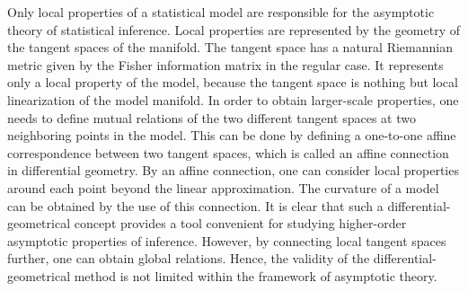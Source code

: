 \documentclass[11pt]{article}
\begin{document}
            Only local properties of a statistical model are responsible for the
asymptotic theory of statistical inference.  Local properties are represented
by the geometry of the tangent spaces of the manifold.  The tangent space has a
natural Riemannian metric given by the Fisher information matrix in the regular
case.  It represents only a local property of the model, because the tangent
space is nothing but local linearization of the model manifold.  In order to
obtain larger-scale properties, one needs to define mutual relations of the two
different tangent spaces at two neighboring points in the model.  This can be
done by defining a one-to-one affine correspondence between two tangent spaces,
which is called an affine connection in differential geometry.  By an affine
connection, one can consider local properties around each point beyond the
linear approximation.  The curvature of a model can be obtained by the use of
this connection.  It is clear that such a differential-geometrical concept pro{vides}
      a tool convenient for studying higher-order asymptotic properties of
inference.  However, by connecting local tangent spaces further, one can obtain
global relations.  Hence, the validity of the differential-geometrical method is
not limited within the framework of asymptotic theory.
\end{document}
